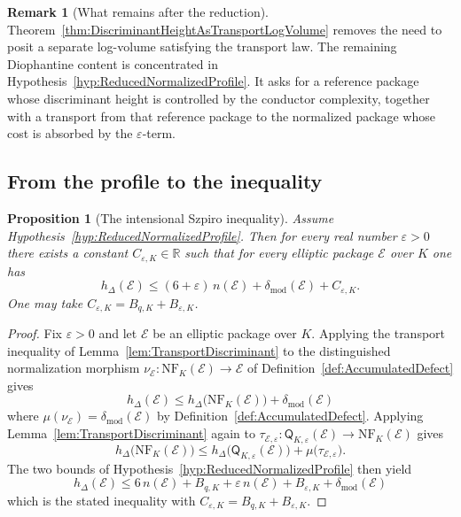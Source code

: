 \documentclass[10pt, reqno]{amsart}
\theoremstyle{plain}
\newtheorem{proposition}[theorem]{Proposition}
\theoremstyle{definition}
\newtheorem{remark}[theorem]{Remark}
\theoremstyle{plain}
\newcommand{\R}{\mathbb{R}}
\newcommand{\defect}{\delta_{\mathrm{mod}}}
\begin{document}
\begin{remark}[What remains after the reduction]\label{rem:WhatRemainsAfterReduction}
Theorem~\ref{thm:DiscriminantHeightAsTransportLogVolume} removes the need to posit a separate log-volume satisfying the transport law. The remaining Diophantine content is concentrated in Hypothesis~\ref{hyp:ReducedNormalizedProfile}. It asks for a reference package whose discriminant height is controlled by the conductor complexity, together with a transport from that reference package to the normalized package whose cost is absorbed by the $\varepsilon$-term.
\end{remark}

\subsection{From the profile to the inequality}\label{subsec:ProfileToInequality}

\begin{proposition}[The intensional Szpiro inequality]\label{prop:NormalizedToIntensionalSzpiro}
Assume Hypothesis~\ref{hyp:ReducedNormalizedProfile}. Then for every real number $\varepsilon>0$ there exists a constant $C_{\varepsilon,K}\in\R$ such that for every elliptic package $\mathcal{E}$ over $K$ one has
\begin{equation}\label{eq:IntensionalSzpiroBasic}
  h_\Delta(\mathcal{E})
  \le
  (6+\varepsilon)\,n(\mathcal{E})
  +
  \defect(\mathcal{E})
  +
  C_{\varepsilon,K}.
\end{equation}
One may take $C_{\varepsilon,K}=B_{q,K}+B_{\varepsilon,K}$.
\end{proposition}

\begin{proof}
Fix $\varepsilon>0$ and let $\mathcal{E}$ be an elliptic package over $K$. Applying the transport inequality of Lemma~\ref{lem:TransportDiscriminant} to the distinguished normalization morphism $\nu_{\mathcal{E}}\colon\mathrm{NF}_K(\mathcal{E})\to\mathcal{E}$ of Definition~\ref{def:AccumulatedDefect} gives
\[
  h_\Delta(\mathcal{E})
  \le
  h_\Delta\bigl(\mathrm{NF}_K(\mathcal{E})\bigr)
  +
  \defect(\mathcal{E})
\]
where $\mu(\nu_{\mathcal{E}})=\defect(\mathcal{E})$ by Definition~\ref{def:AccumulatedDefect}. Applying Lemma~\ref{lem:TransportDiscriminant} again to $\tau_{\mathcal{E},\varepsilon}\colon\mathsf{Q}_{K,\varepsilon}(\mathcal{E})\to\mathrm{NF}_K(\mathcal{E})$ gives
\[
  h_\Delta\bigl(\mathrm{NF}_K(\mathcal{E})\bigr)
  \le
  h_\Delta\bigl(\mathsf{Q}_{K,\varepsilon}(\mathcal{E})\bigr)
  +
  \mu\bigl(\tau_{\mathcal{E},\varepsilon}\bigr).
\]
The two bounds of Hypothesis~\ref{hyp:ReducedNormalizedProfile} then yield
\[
  h_\Delta(\mathcal{E})
  \le
  6\,n(\mathcal{E})+B_{q,K}
  +
  \varepsilon\,n(\mathcal{E})+B_{\varepsilon,K}
  +
  \defect(\mathcal{E})
\]
which is the stated inequality with $C_{\varepsilon,K}=B_{q,K}+B_{\varepsilon,K}$.
\end{proof}
\end{document}
